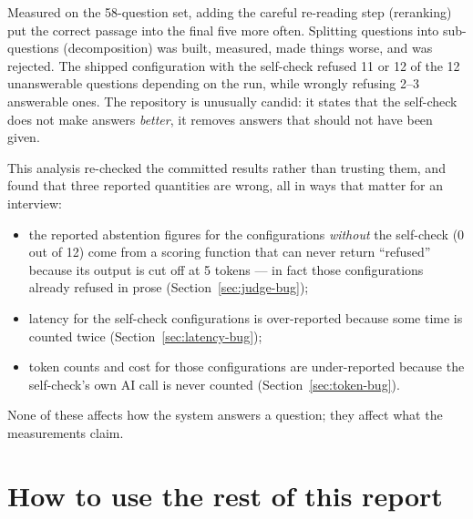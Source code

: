 Measured on the 58-question set, adding the careful re-reading step (reranking) put the correct passage into the final five more often. Splitting questions into sub-questions (decomposition) was built, measured, made things worse, and was rejected. The shipped configuration with the self-check refused 11 or 12 of the 12 unanswerable questions depending on the run, while wrongly refusing 2--3 answerable ones. The repository is unusually candid: it states that the self-check does not make answers \emph{better}, it removes answers that should not have been given.

\begin{finding}
This analysis re-checked the committed results rather than trusting them, and found that three reported quantities are wrong, all in ways that matter for an interview:
\begin{itemize}
  \item the reported abstention figures for the configurations \emph{without} the self-check (0 out of 12) come from a scoring function that can never return ``refused'' because its output is cut off at 5 tokens --- in fact those configurations already refused in prose (Section~\ref{sec:judge-bug});
  \item latency for the self-check configurations is over-reported because some time is counted twice (Section~\ref{sec:latency-bug});
  \item token counts and cost for those configurations are under-reported because the self-check's own AI call is never counted (Section~\ref{sec:token-bug}).
\end{itemize}
None of these affects how the system answers a question; they affect what the measurements claim.
\end{finding}

\section{How to use the rest of this report}

